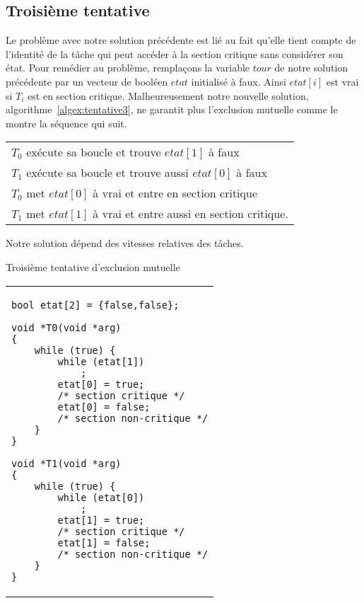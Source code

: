 \subsection*{Troisième tentative}
Le problème avec notre solution précédente est lié au fait qu'elle tient compte de l'identité de la tâche qui peut accéder à la section critique sans considérer son état.
Pour remédier au problème, remplaçons la variable $tour$ de notre solution précédente par un vecteur de booléen $etat$ initialisé à faux.
Ainsi $etat[i]$ est vrai si $T_i$ est en section critique.
Malheureusement notre nouvelle solution, algorithme~\ref{algex:tentative3}, ne garantit plus l'exclusion mutuelle comme le montre la séquence qui suit.
\par\noindent
\begin{center}
\begin{tabular}{l}
$T_0$ exécute sa boucle et trouve $etat[1]$ à faux \\
$T_1$ exécute sa boucle et trouve aussi $etat [0]$ à faux \\
$T_0$ met $etat[0]$ à vrai et entre en section critique \\
$T_1$ met $etat[1]$ à vrai et entre aussi en section critique. \\
\end{tabular}
\end{center}
\par\noindent
Notre solution dépend des vitesses relatives des tâches.

\begin{algorithm}[!ht]
\caption{Troisième tentative d'exclusion mutuelle}\label{algex:tentative3}
\begin{center}
\begin{tabular}{l}
\lstset{language=C++}
\begin{lstlisting}
bool etat[2] = {false,false};

void *T0(void *arg)
{
	while (true) {
		while (etat[1])
			;
		etat[0] = true;
		/* section critique */
		etat[0] = false;
		/* section non-critique */
	}
}

void *T1(void *arg)
{
	while (true) {
		while (etat[0])
			;
		etat[1] = true;
		/* section critique */
		etat[1] = false;
		/* section non-critique */
	}
}
\end{lstlisting}
\end{tabular}
\end{center}
\end{algorithm}

